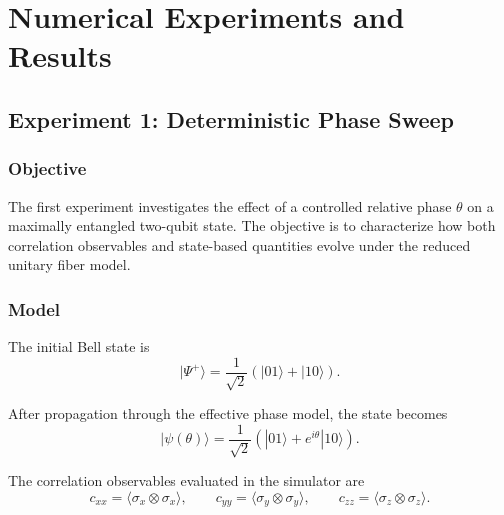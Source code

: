 \documentclass[a4paper]{article}
\begin{document}
\section{Numerical Experiments and Results}



\subsection{Experiment 1: Deterministic Phase Sweep}


\subsubsection{Objective}

The first experiment investigates the effect of a controlled relative phase \( \theta \) on a maximally entangled two-qubit state. The objective is to characterize how both correlation observables and state-based quantities evolve under the reduced unitary fiber model.


\subsubsection{Model}

The initial Bell state is
\[
|\Psi^{+}\rangle
=
\frac{1}{\sqrt{2}}
\left(
|01\rangle + |10\rangle
\right).
\]

After propagation through the effective phase model, the state becomes
\[
|\psi(\theta)\rangle
=
\frac{1}{\sqrt{2}}
\left(
|01\rangle + e^{i\theta}|10\rangle
\right).
\]

The correlation observables evaluated in the simulator are
\[
c_{xx} = \langle \sigma_x \otimes \sigma_x \rangle,\qquad
c_{yy} = \langle \sigma_y \otimes \sigma_y \rangle,\qquad
c_{zz} = \langle \sigma_z \otimes \sigma_z \rangle.
\]

\end{document}
